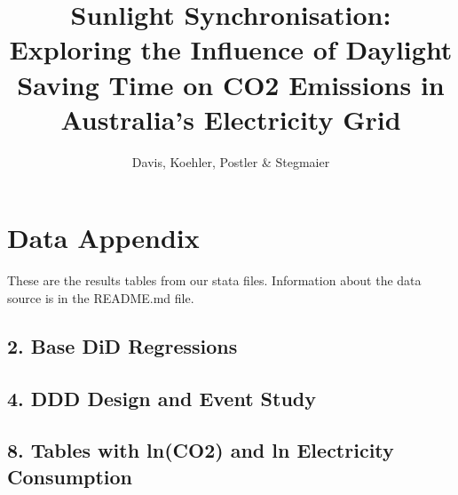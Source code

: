 \documentclass[a4paper]{article}
\title{Sunlight Synchronisation: Exploring the Influence of Daylight Saving Time on CO2 Emissions in Australia's Electricity Grid}
\author{Davis, Koehler, Postler \& Stegmaier}
\begin{document}
\maketitle

\section*{Data Appendix}

These are the results tables from our stata files.
Information about the data source is in the README.md file.

\subsection*{2. Base DiD Regressions}

\resizebox{\textwidth}{!}{
	
}


\subsection*{4. DDD Design and Event Study}

\resizebox{\textwidth}{!}{
	
}

\subsection*{8. Tables with ln(CO2) and ln Electricity Consumption}

\resizebox{\textwidth}{!}{
	
}
\end{document}
